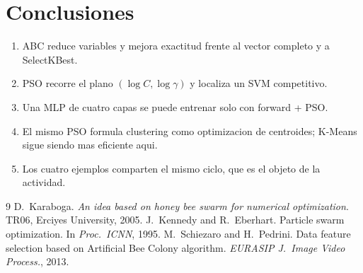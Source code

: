 \documentclass[11pt,oneside]{article}
\begin{document}
\section{Conclusiones}
\begin{enumerate}[leftmargin=1.4em]
  \item ABC reduce variables y mejora exactitud frente al vector completo y a SelectKBest.
  \item PSO recorre el plano $(\log C,\log\gamma)$ y localiza un SVM competitivo.
  \item Una MLP de cuatro capas se puede entrenar solo con forward + PSO.
  \item El mismo PSO formula clustering como optimizacion de centroides; K-Means sigue siendo mas eficiente aqui.
  \item Los cuatro ejemplos comparten el mismo ciclo, que es el objeto de la actividad.
\end{enumerate}

\begin{thebibliography}{9}
 D.~Karaboga. \emph{An idea based on honey bee swarm for numerical optimization}. TR06, Erciyes University, 2005.
 J.~Kennedy and R.~Eberhart. Particle swarm optimization. In \emph{Proc.\ ICNN}, 1995.
 M.~Schiezaro and H.~Pedrini. Data feature selection based on Artificial Bee Colony algorithm. \emph{EURASIP J.\ Image Video Process.}, 2013.
\end{thebibliography}
\end{document}
